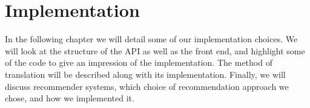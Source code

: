 \chapter{Implementation}
In the following chapter we will detail some of our implementation choices.
We will look at the structure of the API as well as the front end, and highlight some of the code to give an impression of the implementation.
The method of translation will be described along with its implementation.
Finally, we will discuss recommender systems, which choice of recommendation approach we chose, and how we implemented it.






